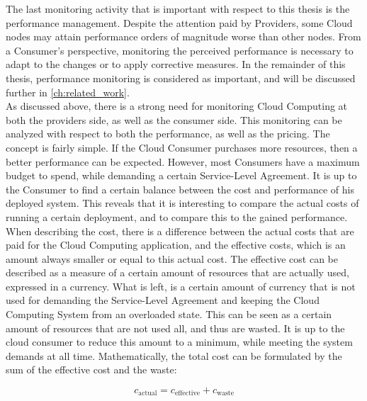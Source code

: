 \noindent
The last monitoring activity that is important with respect to this thesis is the performance management. Despite the attention paid by Providers, some Cloud nodes may attain performance orders of magnitude worse than other nodes. From a Consumer's perspective, monitoring the perceived performance is necessary to adapt to the changes or to apply corrective measures. In the remainder of this thesis, performance monitoring is considered as important, and will be discussed further in \autoref{ch:related_work}.\\

\noindent
As discussed above, there is a strong need for monitoring Cloud Computing at both the providers side, as well as the consumer side. This monitoring can be analyzed with respect to both the performance, as well as the pricing. The concept is fairly simple. If the Cloud Consumer purchases more resources, then a better performance can be expected. However, most Consumers have a maximum budget to spend, while demanding a certain Service-Level Agreement. It is up to the Consumer to find a certain balance between the cost and performance of his deployed system. This reveals that it is interesting to compare the actual costs of running a certain deployment, and to compare this to the gained performance. When describing the cost, there is a difference between the actual costs that are paid for the Cloud Computing application, and the effective costs, which is an amount always smaller or equal to this actual cost. The effective cost can be described as a measure of a certain amount of resources that are actually used, expressed in a currency. What is left, is a certain amount of currency that is not used for demanding the Service-Level Agreement and keeping the Cloud Computing System from an overloaded state. This can be seen as a certain amount of resources that are not used all, and thus are wasted. It is up to the cloud consumer to reduce this amount to a minimum, while meeting the system demands at all time. Mathematically, the total cost can be formulated by the sum of the effective cost and the waste:

\begin{equation}\label{eq:intro}
  c_\text{actual} = c_\text{effective} + c_\text{waste}  
\end{equation}

